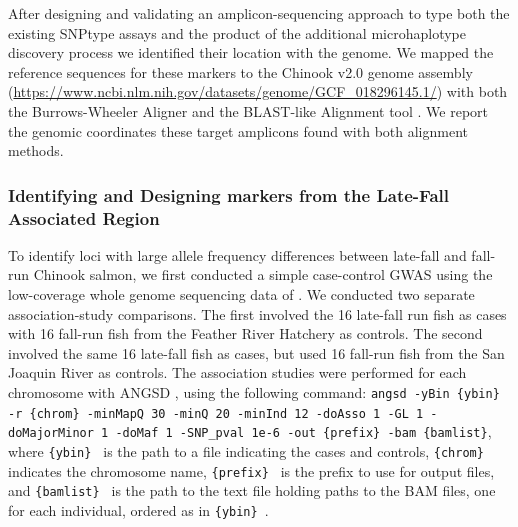 After designing and validating an amplicon-sequencing approach to type both the
existing SNPtype assays and the product of the additional microhaplotype
discovery process we identified their location with the genome. We mapped the reference
sequences for these markers 
to the Chinook v2.0 genome assembly (\url{https://www.ncbi.nlm.nih.gov/datasets/genome/GCF_018296145.1/})
with both the Burrows-Wheeler Aligner \citep{bwa-mem2009} and the BLAST-like Alignment tool \citep{kent2002blat}.
We report the genomic coordinates these target amplicons found with both alignment methods.

\subsubsection*{Identifying and Designing markers from the Late-Fall Associated Region}

To identify loci with large allele frequency differences between late-fall and fall-run Chinook salmon, 
we first conducted a simple case-control GWAS using the low-coverage whole genome sequencing 
data of \citet{thompson2020complex}.  We conducted two separate association-study comparisons.  
The first involved the 16 late-fall run fish as cases with 16 fall-run fish from the Feather River Hatchery as controls. 
The second involved the same 16 late-fall fish as cases, but used 16 fall-run fish from the San 
Joaquin River as controls.  The association studies were performed for each chromosome with 
ANGSD \citep{pmid21663684,korneliussen_angsd_2014}, using the following command: {\footnotesize\tt angsd -yBin \{ybin\}  -r \{chrom\} 
-minMapQ 30 -minQ 20 -minInd 12 -doAsso 1 -GL 1 -doMajorMinor 1 -doMaf 1 -SNP\_pval 1e-6  
-out \{prefix\}  -bam \{bamlist\}}, where {\tt \{ybin\} } is the path to a file indicating the cases and 
controls, 
{\tt \{chrom\} } indicates the chromosome name, {\tt \{prefix\} } is the prefix to use for output files, and 
{\tt \{bamlist\} } is the path to the text file holding paths to the BAM files, one for each individual, ordered as in {\tt \{ybin\} }.

